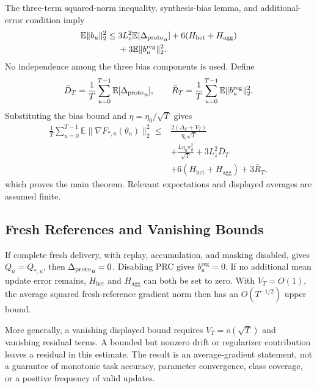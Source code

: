The three-term squared-norm inequality, synthesis-bias lemma, and additional-error condition imply
\begin{equation}
\begin{split}
 \mathbb E\|b_u\|_2^2
 \le{}&3L_z^2\mathbb E[{\Delta_{\mathrm{proto}}}_u]
 +6(H_{\mathrm{het}}+H_{\mathrm{agg}})\\
 &+3\mathbb E\|b_u^{\mathrm{reg}}\|_2^2 .
\end{split}
\label{eq:supp_total_bias}
\end{equation}
No independence among the three bias components is used. Define
\begin{equation*}
 \bar D_T=\frac1T\sum_{u=0}^{T-1}\mathbb E[{\Delta_{\mathrm{proto}}}_u],
 \qquad
 \bar R_T=\frac1T\sum_{u=0}^{T-1}
                  \mathbb E\|b_u^{\mathrm{reg}}\|_2^2.
\end{equation*}
Substituting the bias bound and $\eta=\eta_0/\sqrt T$ gives
\begin{equation}
\begin{split}
 \frac1T\sum_{u=0}^{T-1}
 \mathbb E\|\nabla F_{*,u}(\theta_u)\|_2^2
 \le{}&\frac{2(\Delta_F+V_T)}{\eta_0\sqrt T}\\
 &+\frac{L\eta_0\sigma_g^2}{\sqrt T}
 +3L_z^2\bar D_T\\
 &+6(H_{\mathrm{het}}+H_{\mathrm{agg}})
 +3\bar R_T,
\end{split}
\label{eq:supp_stationarity_bound}
\end{equation}
which proves the main theorem. Relevant expectations and displayed averages are assumed finite.

\subsection{Fresh References and Vanishing Bounds}

If complete fresh delivery, with replay, accumulation, and masking disabled, gives $Q_u=Q_{*,u}$, then ${\Delta_{\mathrm{proto}}}_u=0$. Disabling PRC gives $b_u^{\mathrm{reg}}=0$. If no additional mean update error remains, $H_{\mathrm{het}}$ and $H_{\mathrm{agg}}$ can both be set to zero. With $V_T=O(1)$, the average squared fresh-reference gradient norm then has an $O(T^{-1/2})$ upper bound.

More generally, a vanishing displayed bound requires $V_T=o(\sqrt T)$ and vanishing residual terms. A bounded but nonzero drift or regularizer contribution leaves a residual in this estimate. The result is an average-gradient statement, not a guarantee of monotonic task accuracy, parameter convergence, class coverage, or a positive frequency of valid updates.

